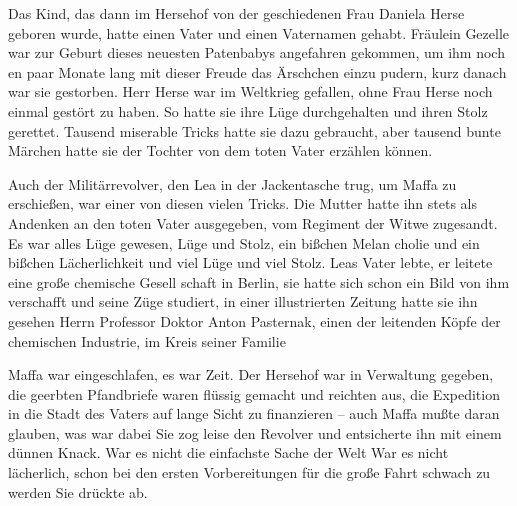 Das Kind, das dann im Hersehof von der geschiedenen Frau
Daniela Herse geboren wurde, hatte einen Vater und einen
Vaternamen gehabt. Fräulein Gezelle war zur Geburt dieses
neuesten Patenbabys angefahren gekommen, um ihm noch
en paar Monate lang mit dieser Freude das Ärschchen einzu\-%
pudern, kurz danach war sie gestorben. Herr Herse war im
Weltkrieg gefallen, ohne Frau Herse noch einmal gestört zu
haben. So hatte sie ihre Lüge durchgehalten und ihren Stolz
gerettet. Tausend miserable Tricks hatte sie dazu gebraucht,
aber tausend bunte Märchen hatte sie der Tochter von dem
toten Vater erzählen können.

Auch der Militärrevolver, den Lea in der Jackentasche trug,
um Maffa zu erschießen, war einer von diesen vielen Tricks.
Die Mutter hatte ihn stets als Andenken an den toten Vater
ausgegeben, vom Regiment der Witwe zugesandt. Es war
alles Lüge gewesen, Lüge und Stolz, ein bißchen Melan\-%
cholie und ein bißchen Lächerlichkeit und viel Lüge und viel
Stolz. Leas Vater lebte, er leitete eine große chemische Gesell\-%
schaft in Berlin, sie hatte sich schon ein Bild von ihm verschafft
und seine Züge studiert, in einer illustrierten Zeitung hatte sie
ihn gesehen\dopp{} Herrn Professor Doktor Anton Pasternak, einen
der leitenden Köpfe der chemischen Industrie, im Kreis seiner
Familie\punkte{}

Maffa war eingeschlafen, es war Zeit. Der Hersehof war in
Verwaltung gegeben, die geerbten Pfandbriefe waren flüssig
gemacht und reichten aus, die Expedition in die Stadt des
Vaters auf lange Sicht zu finanzieren -- auch Maffa mußte
daran glauben, was war dabei\ausr{} Sie zog leise den Revolver
und entsicherte ihn mit einem dünnen Knack. War es nicht die
einfachste Sache der Welt\frag{} War es nicht lächerlich, schon bei
den ersten Vorbereitungen für die große Fahrt schwach zu
werden\frag{} Sie drückte ab.

